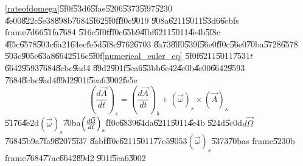 \documentclass[12pt,a4paper]{article}
\begin{document}
\ref{rateofdomega}\U{5f0f}\U{53d6}\U{5fae}\U{5206}\U{5373}\U{5f97}\U{5230}%
\U{4e00}\U{822c}\U{5e38}\U{898b}\U{7684}\U{5f62}\U{5f0f}\U{ff0c}\U{9019}%
\U{908a}\U{6211}\U{5011}\U{53d6}\U{6cbf}s frame\U{7d66}\U{51fa}\U{7684}%
\U{516c}\U{5f0f}\U{ff0c}\U{65b9}\U{4fbf}\U{6211}\U{5011}\U{4e4b}\U{5f8c}%
\U{4f5c}\U{6578}\U{503c}\U{6a21}\U{64ec}\U{fe5d}\U{5f8c}\U{9762}\U{6703}%
\U{8a73}\U{8ff0}\U{539f}\U{56e0}\U{ff0c}\U{56e0}\U{70ba}\U{5728}\U{6578}%
\U{503c}\U{905e}\U{63a8}\U{6642}\U{516c}\U{5f0f}\ref{numerical_euler_eq}%
\U{5f0f}\U{6211}\U{5011}\U{7531}$t$\U{6642}\U{9593}\U{7684}\U{8cbc}\U{9ad4}%
\U{89d2}\U{901f}\U{5ea6}\U{53bb}\U{6c42}\U{4e0b}\U{4e00}\U{6642}\U{9593}%
\U{7684}\U{8cbc}\U{9ad4}\U{89d2}\U{901f}\U{5ea6}\U{3002}\U{fe5e}%
\begin{equation}
\left( \frac{d\vec{A}}{dt}\right) _{s}=\left( \frac{d\vec{A}}{dt}\right)
_{b}+\left( \vec{\omega}\right) _{s}\times \left( \vec{A}\right) _{s}
\label{rateofchange}
\end{equation}%
\U{5176}\U{4e2d}$\left( \vec{\omega}\right) _{s}$\U{70ba}$\left( \frac{d\vec{%
\Omega}}{dt}\right) _{s}$\U{ff0c}\U{6839}\U{64da}\U{6211}\U{5011}\U{4e4b}%
\U{524d}\U{5c0d}$d\vec{\Omega}$\U{7684}\U{5b9a}\U{7fa9}\U{8207}\U{5f37}%
\U{8abf}\U{ff0c}\U{6211}\U{5011}\U{77e5}\U{9053}$\left( \vec{\omega}\right)
_{s}$\U{5373}\U{70ba}s frame\U{5230}b frame\U{7684}\U{77ac}\U{6642}\U{89d2}%
\U{901f}\U{5ea6}\U{3002}
\end{document}
